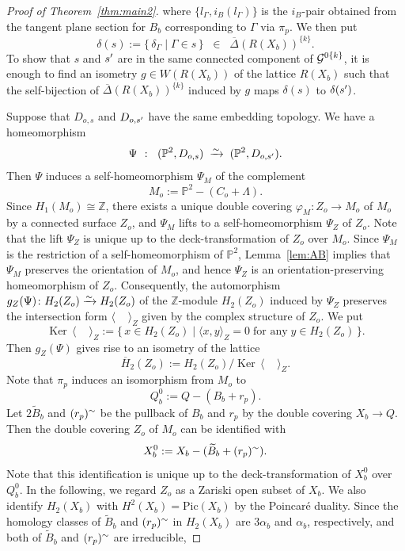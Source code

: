 \documentclass{math}
\theoremstyle{plain}
\numberwithin{equation}{section}
\newcommand{\PP}{\mathord{\mathbb  P}}
\newcommand{\ZZ}{\mathord{\mathbb Z}}
\newcommand{\GGG}{\mathord{\mathcal G}}
\newcommand{\isom}{\xrightarrow{\raise -3pt \hbox{\scriptsize $\sim$} }}
\newcommand{\set}[2]{\{\,{#1}\mid {#2} \,\}}
\newcommand{\sprime}{\sp{\prime}}
\DeclareMathOperator{\Ker}{Ker}
\newcommand{\intf}[1]{\langle #1 \rangle}
\newcommand{\spset}[1]{^{\{#1\}}}
\newcommand{\Pic}{\mathrm{Pic}}
\newcommand{\tilB}{\widetilde{B}}
\newcommand{\barDelta}{\overline{\Delta}}
\newcommand{\barH}{\overline{H}}
\newcommand{\involB}{i_B}
\begin{document}
\begin{proof}[Proof of Theorem~\ref{thm:main2}]
where $\{l_{\Gamma}, \involB(l_{\Gamma})\}$ is the $\involB$-pair  obtained from 
the tangent plane section 
for $B_b$
corresponding to $\Gamma$ via $\pi_p$.
We then put
\[
\delta(s):=\set{\delta_{\Gamma}}{\Gamma\in s}\;\;\in\;\; \barDelta(R(X_b))\spset{k}.
\]
To show that $s$ and $s\sprime$ are in the same connected component of $\GGG\sp{0\{k\}}$,
it is enough to 
find an isometry $g\in W(R(X_b))$ of the lattice $R(X_b)$
such that
the self-bijection of $\barDelta(R(X_b))\spset{k}$ induced by $g$ 
maps $\delta(s)$ to $\delta(s\sprime)$.
\par
Suppose that  $D_{o,s}$ and $D_{o, s\sprime}$ have the same embedding topology.
We have a homeomorphism
\[
\Psi\;\;\colon\;\; (\PP^2, D_{o, s})\;\isom\; (\PP^2, D_{o, s\sprime}).
\]
Then $\Psi$ induces a self-homeomorphism $\Psi_M$ of the complement 
\[
M_o:=\PP^2-(C_o+\Lambda).
\]
Since $H_1(M_o)\cong \ZZ$,
there exists a unique double covering 
$\varphi_M\colon Z_o\to M_o$ 
of $M_o$
by a connected surface $Z_o$, and  $\Psi_M$ 
 lifts to a self-homeomorphism $\Psi_Z$ of $Z_o$.
 Note that the lift $\Psi_Z$ is unique up to the deck-transformation of $Z_o$ over $M_o$.
Since $\Psi_M$ is the restriction of a self-homeomorphism of $\PP^2$,
Lemma~\ref{lem:AB} implies that   $\Psi_M$
preserves the orientation of $M_o$, 
and hence  $\Psi_Z$
is an orientation-preserving homeomorphism of $Z_o$.
Consequently, the automorphism 
$g_Z(\Psi)\colon H_2(Z_o)\isom H_2(Z_o)$
of the $\ZZ$-module $H_2(Z_o)$
induced by $\Psi_Z$  
preserves the intersection form $\intf{\phantom{i,i}}_Z$
given  by the complex structure of $Z_o$.
We put
\[
\Ker\, \intf{\phantom{i,i}}_Z:=\set{x\in H_2(Z_o)}{\intf{x, y}_Z=0\;\textrm{for any}\; y\in H_2(Z_o)}.
\]
Then $g_Z(\Psi)$ gives rise to  
an isometry  
of the lattice 
\[
\barH_2(Z_o):=H_2(Z_o)/\Ker\, \intf{\phantom{i,i}}_Z.
\]
Note that $\pi_p$ induces an isomorphism from $M_o$ to 
\[
Q_b^0:=Q-(B_b+r_p).
\]
Let $2\tilB_b$ and $(r_p)\sp{\sim}$ be the pullback of $B_b$ and $r_p$ by the double covering
$X_b\to Q$. 
Then the double covering $Z_o$ of $M_o$ can be identified with 
\[
X_b^0:=X_b-(\tilB_b+(r_p)\sp{\sim}).
\]
Note that this identification 
 is unique up to the deck-transformation of $X_b^0$ over~$Q_b^0$.
In the following,  
we regard $Z_o$ as a Zariski open subset of $X_b$.
We also  identify $H_2(X_b)$ with $H^2(X_b)=\Pic(X_b)$ by the Poincar\'e duality.
Since the homology classes of $\tilB_b$ and  $(r_p)\sp{\sim}$  in $H_2(X_b)$ are $3\alpha_b$ and $\alpha_b$,
respectively, and both of $\tilB_b$ and  $(r_p)\sp{\sim}$ are irreducible, 

\end{proof}
\end{document}
